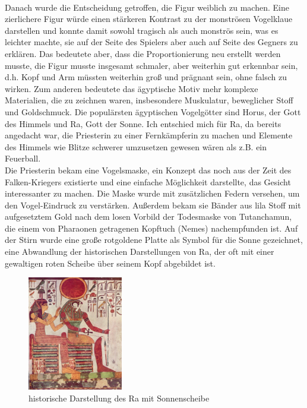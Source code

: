 \documentclass[extern,palatino]{cgBA}
\begin{document}
\\Danach wurde die Entscheidung getroffen, die Figur weiblich zu machen. Eine zierlichere Figur würde einen stärkeren Kontrast zu der monströsen Vogelklaue darstellen und konnte damit sowohl tragisch als auch monströs sein, was es leichter machte, sie auf der Seite des Spielers aber auch auf Seite des Gegners zu erklären. Das bedeutete aber, dass die Proportionierung neu erstellt werden musste, die Figur musste insgesamt schmaler, aber weiterhin gut erkennbar sein, d.h. Kopf und Arm müssten weiterhin groß und prägnant sein, ohne falsch zu wirken. Zum anderen bedeutete das ägyptische Motiv mehr komplexe Materialien, die zu zeichnen waren, insbesondere Muskulatur, beweglicher Stoff und Goldschmuck. Die populärsten ägyptischen Vogelgötter sind Horus, der Gott des Himmels und Ra, Gott der Sonne. Ich entschied mich für Ra, da bereits angedacht war, die Priesterin zu einer Fernkämpferin zu machen und Elemente des Himmels wie Blitze schwerer umzusetzen gewesen wären als z.B. ein Feuerball.
\\Die Priesterin bekam eine Vogelsmaske, ein Konzept das noch aus der Zeit des Falken-Kriegers existierte und eine einfache Möglichkeit darstellte, das Gesicht interessanter zu machen. Die Maske wurde mit zusätzlichen Federn versehen, um den Vogel-Eindruck zu verstärken. Außerdem bekam sie Bänder aus lila Stoff mit aufgesetztem Gold nach dem losen Vorbild der Todesmaske von Tutanchamun, die einem von Pharaonen getragenen Kopftuch (Nemes) nachempfunden ist. Auf der Stirn wurde eine große rotgoldene Platte als Symbol für die Sonne gezeichnet, eine Abwandlung der historischen Darstellungen von Ra, der oft mit einer gewaltigen roten Scheibe über seinem Kopf abgebildet ist.\\
\begin{figure}[H]
	\centering
	\includegraphics[height=5cm]{ra.jpg}
	\caption{historische Darstellung des Ra mit Sonnenscheibe}
	\label{ra}
\end{figure}
\end{document}
